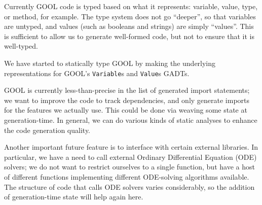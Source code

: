 \documentclass[sigplan,review,prologue,dvipsnames]{acmart}
\begin{document}
Currently GOOL code is typed based on what it represents:
variable, value, type, or method, for example. The type system does not
go ``deeper'', so that variables are untyped, and values (such as booleans
and strings) are simply ``values''.  This is sufficient to allow us to
generate well-formed code, but not to ensure that it is well-typed.

We have started to statically type GOOL by making the underlying 
representations for GOOL's \verb|Variable|s and \verb|Value|s GADTs. 

GOOL is currently less-than-precise in the list of generated import statements;
we want to improve the code to track dependencies, and only generate
imports for the features we actually use. This could be done via weaving
some state at generation-time.  In general, we can do various 
kinds of static analyses to enhance the code generation quality.

Another important future feature is to interface with certain external 
libraries. In particular, we have a need to
call external Ordinary Differential Equation (ODE) solvers; we do not
want to restrict ourselves to a single function, but have a host of
different functions implementing different ODE-solving algorithms available.
The structure of code that calls ODE solvers varies considerably, so the 
addition of generation-time state will help again here.

\end{document}
